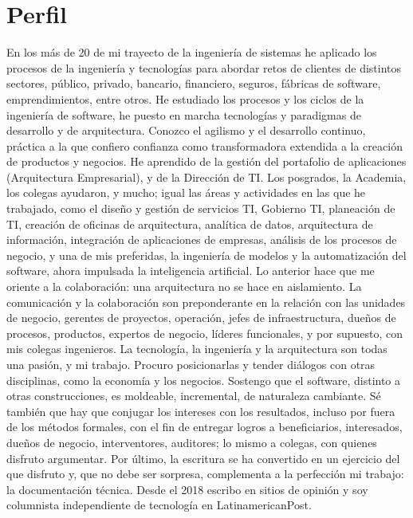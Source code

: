\documentclass{tufte-handout}
\begin{document}
  
\section{Perfil}\label{sec:perfil}
En los más de 20 de mi trayecto de la ingeniería de sistemas he aplicado
los procesos de la ingeniería y tecnologías para abordar retos de
clientes de distintos sectores, público, privado, bancario, financiero,
seguros, fábricas de software, emprendimientos, entre otros. He
estudiado los procesos y los ciclos de la ingeniería de software, he
puesto en marcha tecnologías y paradigmas de desarrollo y de
arquitectura. Conozco el agilismo y el desarrollo continuo, práctica a
la que confiero confianza como transformadora extendida a la creación de
productos y negocios. He aprendido de la gestión del portafolio de
aplicaciones (Arquitectura Empresarial), y de la Dirección de TI. Los
posgrados, la Academia, los colegas ayudaron, y mucho; igual las áreas y
actividades en las que he trabajado, como el diseño y gestión de
servicios TI, Gobierno TI, planeación de TI, creación de oficinas de
arquitectura, analítica de datos, arquitectura de información,
integración de aplicaciones de empresas, análisis de los procesos de
negocio, y una de mis preferidas, la ingeniería de modelos y la
automatización del software, ahora impulsada la inteligencia artificial.
Lo anterior hace que me oriente a la colaboración: una arquitectura no
se hace en aislamiento. La comunicación y la colaboración son
preponderante en la relación con las unidades de negocio, gerentes de
proyectos, operación, jefes de infraestructura, dueños de procesos,
productos, expertos de negocio, líderes funcionales, y por supuesto, con
mis colegas ingenieros. La tecnología, la ingeniería y la arquitectura
son todas una pasión, y mi trabajo. Procuro posicionarlas y tender
diálogos con otras disciplinas, como la economía y los negocios.
Sostengo que el software, distinto a otras construcciones, es moldeable,
incremental, de naturaleza cambiante. Sé también que hay que conjugar
los intereses con los resultados, incluso por fuera de los métodos
formales, con el fin de entregar logros a beneficiarios, interesados,
dueños de negocio, interventores, auditores; lo mismo a colegas, con
quienes disfruto argumentar. Por último, la escritura se ha convertido
en un ejercicio del que disfruto y, que no debe ser sorpresa,
complementa a la perfección mi trabajo: la documentación técnica. Desde
el 2018 escribo en sitios de opinión y soy columnista independiente de
tecnología en LatinamericanPost.
\end{document}
